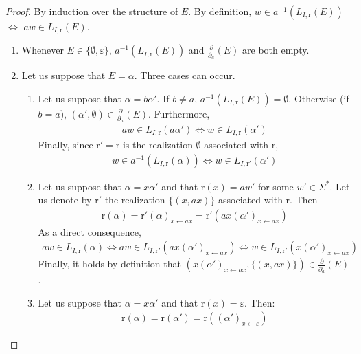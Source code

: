 \documentclass[a4paper]{llncs}
\begin{document}
  \begin{proof}
    By induction over the structure of $E$. By definition, $w\in a^{-1}(L_{I,\mathrm{r}}(E))$ $\Leftrightarrow$ $aw \in L_{I,\mathrm{r}}(E)$.     
    \begin{enumerate}
      \item Whenever $E\in\{\emptyset,\varepsilon\}$, $a^{-1}(L_{I,\mathrm{r}}(E))$ and $\frac{\partial}{\partial_a}(E)$ are both empty.
      \item Let us suppose that $E=\alpha$. Three cases can occur.
      \begin{enumerate}
        \item Let us suppose that $\alpha=b\alpha'$. If $b\neq a$, $a^{-1}(L_{I,\mathrm{r}}(E))=\emptyset$.        
        Otherwise (if $b=a$), $(\alpha',\emptyset)\in \frac{\partial}{\partial_a}(E)$. Furthermore,
        \begin{align*}
          aw \in L_{I,\mathrm{r}}(a\alpha') \Leftrightarrow w\in L_{I,\mathrm{r}}(\alpha')
        \end{align*}        
        Finally, since $\mathrm{r}'=\mathrm{r}$ is the realization $\emptyset$-associated with $\mathrm{r}$,
        \begin{align*}
          w\in a^{-1}(L_{I,\mathrm{r}}(\alpha)) \Leftrightarrow w\in L_{I,\mathrm{r}'}(\alpha')
        \end{align*}         
        \item Let us suppose that $\alpha=x\alpha'$ and that $\mathrm{r}(x)=aw'$ for some $w'\in\Sigma^*$. Let us denote by $\mathrm{r}'$ the realization $\{(x,ax)\}$-associated with $\mathrm{r}$. Then
        \begin{align*}
          \mathrm{r}(\alpha)=\mathrm{r'}(\alpha)_{x\leftarrow ax}=\mathrm{r}'(ax(\alpha')_{x\leftarrow ax})
        \end{align*}        
        As a direct consequence, 
        \begin{align*}
          aw \in L_{I,\mathrm{r}}(\alpha) \Leftrightarrow aw \in L_{I,\mathrm{r}'}(ax(\alpha')_{x\leftarrow ax}) \Leftrightarrow w \in L_{I,\mathrm{r}'}(x(\alpha')_{x\leftarrow ax})
        \end{align*}        
        Finally, it holds by definition that $(x(\alpha')_{x\leftarrow ax},\{(x,ax)\})\in \frac{\partial}{\partial_a}(E)$.        
        \item Let us suppose that $\alpha=x\alpha'$ and that $\mathrm{r}(x)=\varepsilon$. Then:
        \begin{align*}
          \mathrm{r}(\alpha) =\mathrm{r}(\alpha')=\mathrm{r}((\alpha')_{x\leftarrow\varepsilon})

\end{align*}
\end{enumerate}
\end{enumerate}
\end{proof}
\end{document}

